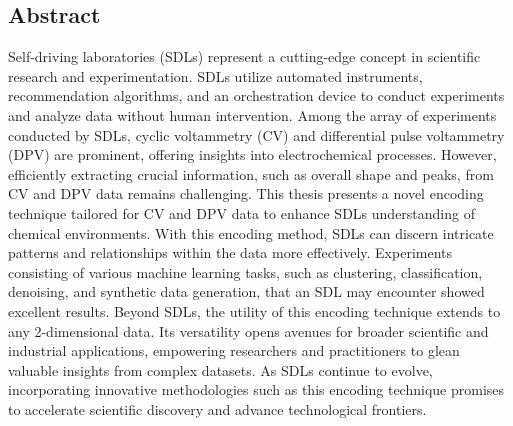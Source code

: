 \begin{center}
\chapter*{\centering Abstract} 
\begin{singlespace}
Self-driving laboratories (SDLs) represent a cutting-edge concept in scientific research and experimentation. SDLs utilize automated instruments, recommendation algorithms, and an orchestration device to conduct experiments and analyze data without human intervention. Among the array of experiments conducted by SDLs, cyclic voltammetry (CV) and differential pulse voltammetry (DPV) are prominent, offering insights into electrochemical processes. However, efficiently extracting crucial information, such as overall shape and peaks, from CV and DPV data remains challenging. This thesis presents a novel encoding technique tailored for CV and DPV data to enhance SDLs\textquotesingle{} understanding of chemical environments. With this encoding method, SDLs can discern intricate patterns and relationships within the data more effectively. Experiments consisting of various machine learning tasks, such as clustering, classification, denoising, and synthetic data generation, that an SDL may encounter showed excellent results. Beyond SDLs, the utility of this encoding technique extends to any 2-dimensional data. Its versatility opens avenues for broader scientific and industrial applications, empowering researchers and practitioners to glean valuable insights from complex datasets. As SDLs continue to evolve, incorporating innovative methodologies such as this encoding technique promises to accelerate scientific discovery and advance technological frontiers.
\end{singlespace}
\end{center}